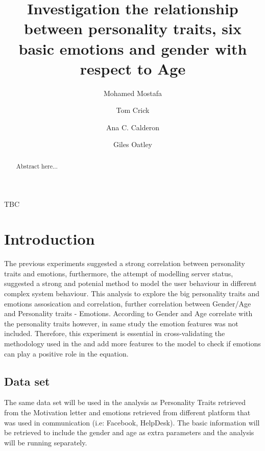 \documentclass{llncs}
\begin{document}
\title{Investigation the relationship between personality traits, six basic emotions and gender with respect to Age}

\author{Mohamed Mostafa \and Tom
  Crick \and Ana C. Calderon \and Giles Oatley}



\maketitle

\begin{abstract}
Abstract here...
 \end{abstract}

\begin{keywords}
TBC
\end{keywords}

\section{Introduction}\label{intro}

The previous experiments suggested a strong correlation between personality traits and emotions, furthermore, the attempt of modelling server status, suggested a strong and potenial method to model the user behaviour in different complex system behaviour. This analysis to explore the big personality traits and emotions assosication and correlation, further correlation between Gender/Age and Personality traits - Emotions. According to \cite{10.1371/journal.pone.0073791} Gender and Age correlate with the personality traits however, in same study the emotion features was not included. Therefore, this experiment is essential in cross-validating the methodology used in the \cite{10.1371/journal.pone.0073791} and add more features to the model to check if emotions can play a positive role in the equation.

\subsection{Data set}
The same data set will be used in the analysis as Personality Traits retrieved from the Motivation letter and emotions retrieved from different platform that was used in communication (i.e: Facebook, HelpDesk). The basic information will be retrieved to include the gender and age as extra parameters and the analysis will be running separately.
\end{document}
